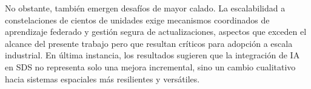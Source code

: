 No obstante, también emergen desafíos de mayor calado. La escalabilidad a constelaciones de cientos de unidades exige mecanismos coordinados de aprendizaje federado y gestión segura de actualizaciones, aspectos que exceden el alcance del presente trabajo pero que resultan críticos para adopción a escala industrial. En última instancia, los resultados sugieren que la integración de IA en SDS no representa solo una mejora incremental, sino un cambio cualitativo hacia sistemas espaciales más resilientes y versátiles.
